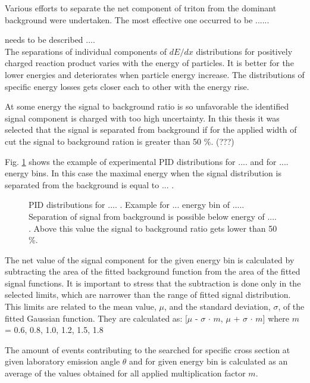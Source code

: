 Various efforts to separate the net component of triton from the dominant background were undertaken. 
The most effective one occurred to be ......

\vspace{5cm}
needs to be described .... \\


The separations of individual components of $dE/dx$ distributions for positively charged reaction product 
varies with the energy of particles. It is better for the lower energies and deteriorates when particle energy increase.
The distributions of specific energy losses gets closer each to other with the energy rise.

At some energy the signal to background ratio is so unfavorable the identified 
signal component is charged with too high uncertainty.
In this thesis it was selected that the signal is separated from background 
if for the applied width of cut the signal to background ration is greater than 50 \%. (???) 

Fig. \ref{sig_back_separation} shows the example of experimental PID distributions for .... and for .... energy bins. 
In this case the maximal energy when the signal distribution is separated from the background is equal to ... .

 \begin{figure}
   	\centering
   	\caption{PID distributions for .... . Example for ... energy bin of ..... Separation of signal from background is possible
   	below energy of .... . Above this value the signal to background ratio gets lower than 50 \%.
    }
   	\label{sig_back_separation}
   \end{figure} 


The net value of the signal component for the given energy bin is calculated by subtracting the area of the fitted background function from the area of the 
fitted signal functions. It is important to stress that the subtraction is done only in the selected limits, which are narrower than the range 
of fitted signal distribution. This limits are related to the  mean value, $\mu$, and the standard deviation, $\sigma$, of the fitted Gaussian 
function. They are calculated as:  
[$\mu$ - $\sigma$ $\cdot$ $m$, $\mu$ + $\sigma$ $\cdot$ $m$] where $m$ = 0.6, 0.8, 1.0, 1.2, 1.5, 1.8 

The amount of events contributing to the searched for specific cross section 
at given laboratory emission angle $\theta$ and for given energy bin 
is calculated as an average of the values obtained 
for all applied multiplication factor $m$.  

